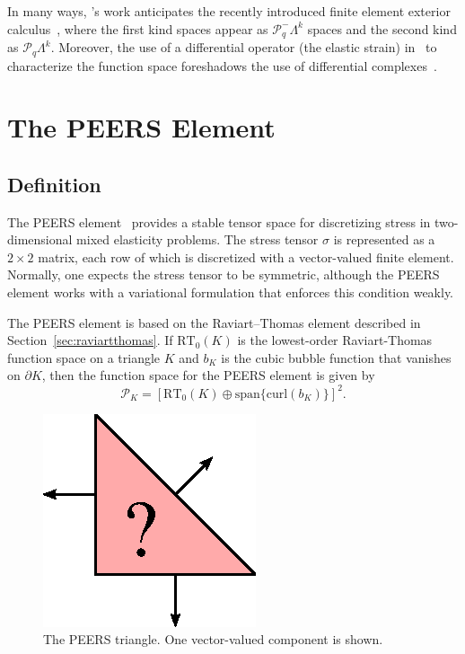 In many ways, \nedelec{}'s work anticipates the recently introduced
finite element exterior calculus~\cite{ArnoldFalkEtAl2006}, where the
first kind spaces appear as \( \mathcal{P}_q^-\Lambda^k \) spaces and
the second kind as \(
\mathcal{P}_q\Lambda^k \). Moreover, the use of a differential
operator (the elastic strain) in~\cite{Nedelec1980} to characterize
the function space foreshadows the use of differential
complexes~\cite{ArnoldFalkEtAl2006a}.


\newpage

\section{The PEERS Element}

\subsection{Definition}

The PEERS element~\cite{ArnoldBrezziEtAl1984} provides a stable tensor
space for discretizing stress in two-dimensional mixed elasticity
problems. The stress tensor \( \sigma \) is represented as a \( 2
\times 2 \) matrix, each row of which is discretized with a
vector-valued finite element.  Normally, one expects the stress tensor
to be symmetric, although the PEERS element works with a variational
formulation that enforces this condition weakly.

The PEERS element is based on the Raviart--Thomas element described in
Section~\ref{sec:raviartthomas}.  If \( \mathrm{RT}_0(K) \) is the
lowest-order Raviart-Thomas function space on a triangle \( K \) and
\( b_K \) is the cubic bubble function that vanishes on \( \partial K
\), then the function space for the PEERS element is given by
\begin{displaymath}
\mathcal{P}_K = \left[\mathrm{RT}_0(K) \oplus \mathrm{span}\{\mathrm{curl}( b_K )\} \right]^2.
\end{displaymath}

\begin{figure}[H]
  \begin{center}
    \includegraphics[width=\elementwidth]{chapters/kirby-6/eps/PEERS.eps}
    \caption{The PEERS triangle. One vector-valued component is shown.}
  \end{center}
\end{figure}

